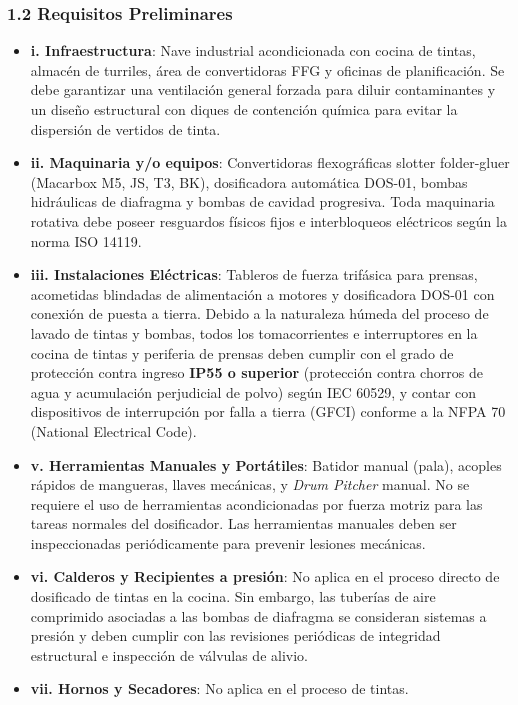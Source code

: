 \documentclass[11pt, letterpaper]{article}
\begin{document}
\subsubsection{1.2 Requisitos Preliminares}
\begin{itemize}
    \item \textbf{i. Infraestructura}: Nave industrial acondicionada con cocina de tintas, almacén de turriles, área de convertidoras FFG y oficinas de planificación. Se debe garantizar una ventilación general forzada para diluir contaminantes y un diseño estructural con diques de contención química para evitar la dispersión de vertidos de tinta.
    \item \textbf{ii. Maquinaria y/o equipos}: Convertidoras flexográficas slotter folder-gluer (Macarbox M5, JS, T3, BK), dosificadora automática DOS-01, bombas hidráulicas de diafragma y bombas de cavidad progresiva. Toda maquinaria rotativa debe poseer resguardos físicos fijos e interbloqueos eléctricos según la norma ISO 14119.
    \item \textbf{iii. Instalaciones Eléctricas}: Tableros de fuerza trifásica para prensas, acometidas blindadas de alimentación a motores y dosificadora DOS-01 con conexión de puesta a tierra. Debido a la naturaleza húmeda del proceso de lavado de tintas y bombas, todos los tomacorrientes e interruptores en la cocina de tintas y periferia de prensas deben cumplir con el grado de protección contra ingreso \textbf{IP55 o superior} (protección contra chorros de agua y acumulación perjudicial de polvo) según IEC 60529, y contar con dispositivos de interrupción por falla a tierra (GFCI) conforme a la NFPA 70 (National Electrical Code).
    \item \textbf{v. Herramientas Manuales y Portátiles}: Batidor manual (pala), acoples rápidos de mangueras, llaves mecánicas, y \textit{Drum Pitcher} manual. No se requiere el uso de herramientas acondicionadas por fuerza motriz para las tareas normales del dosificador. Las herramientas manuales deben ser inspeccionadas periódicamente para prevenir lesiones mecánicas.
    \item \textbf{vi. Calderos y Recipientes a presión}: No aplica en el proceso directo de dosificado de tintas en la cocina. Sin embargo, las tuberías de aire comprimido asociadas a las bombas de diafragma se consideran sistemas a presión y deben cumplir con las revisiones periódicas de integridad estructural e inspección de válvulas de alivio.
    \item \textbf{vii. Hornos y Secadores}: No aplica en el proceso de tintas.

\end{itemize}
\end{document}
